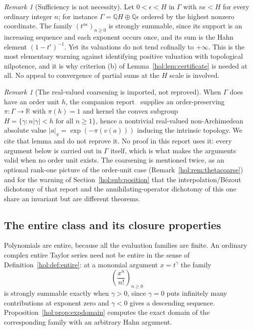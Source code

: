 \documentclass[11pt]{article}
\numberwithin{equation}{section}
\theoremstyle{definition}
\theoremstyle{remark}
\newtheorem{remark}[theorem]{Remark}
\newcommand{\R}{\mathbb R}
\newcommand{\Q}{\mathbb Q}
\newcommand{\abs}[1]{\lvert#1\rvert}
\begin{document}
\begin{remark}[Sufficiency is not necessity]\label{hol:rem:positive}
Let $0<\epsilon<H$ in $\Gamma$ with $n\epsilon<H$ for every ordinary integer
$n$; for instance $\Gamma=\Q H\oplus\Q\epsilon$ ordered by the highest nonzero
coordinate. The family $(t^{n\epsilon})_{n\ge0}$ is strongly summable, since
its support is an increasing sequence and each exponent occurs once, and its
sum is the Hahn element $(1-t^\epsilon)^{-1}$. Yet its valuations do not tend
cofinally to $+\infty$. This is the most elementary warning against
identifying positive valuation with topological nilpotence, and it is why
criterion (b) of Lemma~\ref{hol:lem:certificate} is needed at all. No appeal
to convergence of partial sums at the $H$ scale is involved.
\end{remark}

\begin{remark}[The real-valued coarsening is imported, not reproved]
\label{hol:rem:coarsening}
When $\Gamma$ does have an order unit $h$, the companion
report~\cite[Lemma~9.1, \texttt{ent:lem:coarsening}]{repoentire} supplies an
order-preserving $\pi:\Gamma\to\R$ with $\pi(h)=1$ and kernel the convex
subgroup $H=\{\gamma:n\abs\gamma<h\text{ for all }n\ge1\}$, hence a nontrivial
real-valued non-Archimedean absolute value $\abs a_\pi=\exp(-\pi(v(a)))$
inducing the intrinsic topology. We cite that lemma and do not reprove it. No
proof in this report uses it: every argument below is carried out in $\Gamma$
itself, which is what makes the arguments valid when no order unit exists.
The coarsening is mentioned twice, as an optional rank-one picture of the
order-unit case (Remark~\ref{hol:rem:thetacoarse}) and for the warning of
Section~\ref{hol:sub:position} that the interpolation/B\'ezout dichotomy of
that report and the annihilating-operator dichotomy of this one share an
invariant but are different theorems.
\end{remark}

\subsection{The entire class and its closure properties}

Polynomials are entire, because all the evaluation families are finite. An
ordinary complex entire Taylor series need not be entire in the sense of
Definition~\ref{hol:def:entire}: at a monomial argument $x=t^\gamma$ the
family
\begin{equation}\label{hol:eq:monomialexp}
 \left(\frac{x^n}{n!}\right)_{n\ge0}
\end{equation}
is strongly summable exactly when $\gamma>0$, since $\gamma=0$ puts infinitely
many contributions at exponent zero and $\gamma<0$ gives a descending
sequence. Proposition~\ref{hol:prop:expdomain} computes the exact domain of
the corresponding family with an arbitrary Hahn argument.
\end{document}
